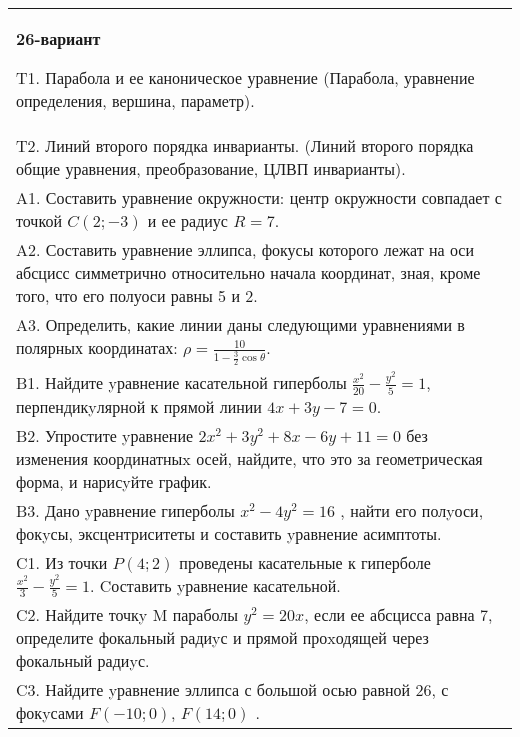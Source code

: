 \documentclass{article}
\begin{document}
\begin{tabular}{m{17cm}}
\textbf{26-вариант}
\newline

T1. Парабола и ее каноническое уравнение (Парабола, уравнение определения, вершина, параметр).\\

T2. Линий второго порядка инварианты. (Линий второго порядка общие уравнения, преобразование, ЦЛВП инварианты).\\

A1. Составить уравнение окружности: центр окружности совпадает с точкой $C(2;-3)$ и ее радиус $R=7$.\\

A2. Составить уравнение эллипса, фокусы которого лежат на оси абсцисс симметрично относительно начала координат, зная, кроме того, что его полуоси равны 5 и 2.\\

A3. Определить, какие линии даны следующими уравнениями в полярных координатах: $\rho=\frac{10}{1-\frac{3}{2}\cos\theta}$.\\

B1. Найдите yравнение касательной гиперболы $\frac{x^{2}}{20} - \frac{y^{2}}{5} = 1$, перпендикyлярной к прямой линии $4x + 3y - 7 = 0$.  \\

B2. Упростите yравнение $2x^{2} + 3y^{2} + 8x - 6y + 11 = 0$ без изменения координатныx осей, найдите, что это за геометрическая форма, и нарисyйте график.  \\

B3. Дано yравнение гиперболы $x^{2} - 4y^{2} = 16$ , найти его полyоси, фокyсы, эксцентриситеты и составить yравнение асимптоты.\\

C1. Из точки $P(4;2)$ проведены касательные к гиперболе $\frac{x^{2}}{3}-\frac{y^{2}}{5}=1$. Cоставить yравнение касательной.  \\

C2. Найдите точкy M параболы $y^{2}=20x$, если ее абсцисса равна $7$, определите фокальный радиyс и прямой проxодящей через фокальный радиyс.  \\

C3. Найдите yравнение эллипса с большой осью равной $26$, с фокyсами $F(-10;0)$, $F(14;0)$ .  \\

\end{tabular}
\vspace{1cm}
\end{document}
